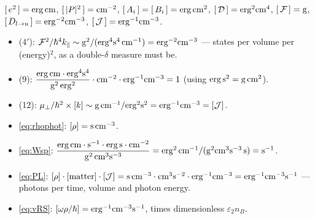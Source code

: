 \documentclass[11pt,a4paper]{article}
\numberwithin{equation}{section}
\newcommand{\cD}{\mathcal{D}}
\newcommand{\cF}{\mathcal{F}}
\newcommand{\cJ}{\mathcal{J}}
\newcommand{\kpar}{k_{\parallel}}
\newcommand{\eps}{\varepsilon}
\newcommand{\Dlu}{D_{l\to u}}
\begin{document}
$[\,e^2\,]={\rm erg\,cm}$, $[\,|P|^2\,]={\rm cm^{-2}}$,
$[\,A_i\,]=[\,B_i\,]={\rm erg\,cm^2}$, $[\,\cD\,]={\rm erg^2cm^4}$,
$[\,\cF\,]={\rm g}$, $[\,\Dlu\,]={\rm erg^{-2}cm^{-3}}$,
$[\,\cJ\,]={\rm erg^{-1}cm^{-3}}$.
\begin{itemize}
\item ($4'$): $\cF^2/\hbar^4\kpar\sim
{\rm g^2}/({\rm erg^4s^4\,cm^{-1}})={\rm erg^{-2}cm^{-3}}$ ---
states per volume per (energy)$^2$, as a double-$\delta$ measure must
be. \checkmark
\item (9): $\dfrac{{\rm erg\,cm}\cdot{\rm erg^4s^4}}
{{\rm g^2}\,{\rm erg^2}}\cdot{\rm cm^{-2}}\cdot
{\rm erg^{-1}cm^{-3}}=1$ (using ${\rm erg\,s^2=g\,cm^2}$). \checkmark
\item (12): $\mu_\perp/\hbar^2\times[k]\sim
{\rm g\,cm^{-1}}/{\rm erg^2s^2}={\rm erg^{-1}cm^{-3}}=[\cJ]$. \checkmark
\item \eqref{eq:rhophot}: $[\rho]={\rm s\,cm^{-3}}$. \checkmark
\item \eqref{eq:Wsp}: $\dfrac{{\rm erg\,cm}\cdot{\rm s^{-1}}\cdot
{\rm erg\,s}\cdot{\rm cm^{-2}}}{{\rm g^2\,cm^3s^{-3}}}
={\rm erg^2\,cm^{-1}}/({\rm g^2cm^3s^{-3}}\,{\rm s})
={\rm s^{-1}}$. \checkmark
\item \eqref{eq:PL}: $[\rho]\cdot[\text{matter}]\cdot[\cJ]
={\rm s\,cm^{-3}}\cdot{\rm cm^3s^{-2}}\cdot{\rm erg^{-1}cm^{-3}}
={\rm erg^{-1}cm^{-3}s^{-1}}$ --- photons per time, volume and photon
energy. \checkmark
\item \eqref{eq:vRS}: $[\omega\rho/\hbar]
={\rm erg^{-1}cm^{-3}s^{-1}}$, times dimensionless
$\eps_2n_B$. \checkmark
\end{itemize}
\end{document}
